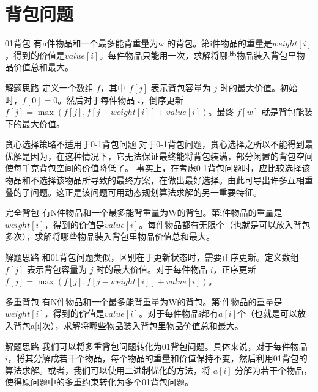 \documentclass{beamer}
\begin{document}
\section{背包问题}

\begin{frame}{01背包}
    有n件物品和一个最多能背重量为w 的背包。第i件物品的重量是$weight[i]$，得到的价值是$value[i]$。每件物品只能用一次，求解将哪些物品装入背包里物品价值总和最大。
\end{frame}

\begin{frame}{解题思路}
    定义一个数组 $f$，其中 $f[j]$ 表示背包容量为 $j$ 时的最大价值。初始时，$f[0] = 0$。然后对于每件物品 $i$，倒序更新 $f[j] = \max(f[j], f[j - weight[i]] + value[i])$。最终 $f[w]$ 就是背包能装下的最大价值。
\end{frame}

\begin{frame}{贪心选择策略不适用于0-1背包问题}
    对于0-1背包问题，贪心选择之所以不能得到最优解是因为，在这种情况下，它无法保证最终能将背包装满，部分闲置的背包空间使每千克背包空间的价值降低了。 事实上，在考虑0-1背包问题时，应比较选择该物品和不选择该物品所导致的最终方案，在做出最好选择。由此可导出许多互相重叠的子问题。这正是该问题可用动态规划算法求解的另一重要特征。
\end{frame}

\begin{frame}{完全背包}
    有N件物品和一个最多能背重量为W的背包。第i件物品的重量是$weight[i]$，得到的价值是$value[i]$。每件物品都有无限个（也就是可以放入背包多次），求解将哪些物品装入背包里物品价值总和最大。
\end{frame}

\begin{frame}{解题思路}
    和01背包问题类似，区别在于更新状态时，需要正序更新。定义数组 $f[j]$ 表示背包容量为 $j$ 时的最大价值。对于每件物品 $i$，正序更新 $f[j] = \max(f[j], f[j - weight[i]] + value[i])$。
\end{frame}

\begin{frame}{多重背包}
    有N件物品和一个最多能背重量为W的背包。第i件物品的重量是$weight[i]$，得到的价值是$value[i]$。对于每件物品i都有$a[i]$个（也就是可以放入背包a[i]次），求解将哪些物品装入背包里物品价值总和最大。
\end{frame}

\begin{frame}{解题思路}
    我们可以将多重背包问题转化为01背包问题。具体来说，对于每件物品 $i$，将其分解成若干个物品，每个物品的重量和价值保持不变，然后利用01背包的算法求解。或者，我们可以使用二进制优化的方法，将 $a[i]$ 分解为若干个物品，使得原问题中的多重约束转化为多个01背包问题。
\end{frame}
\end{document}
